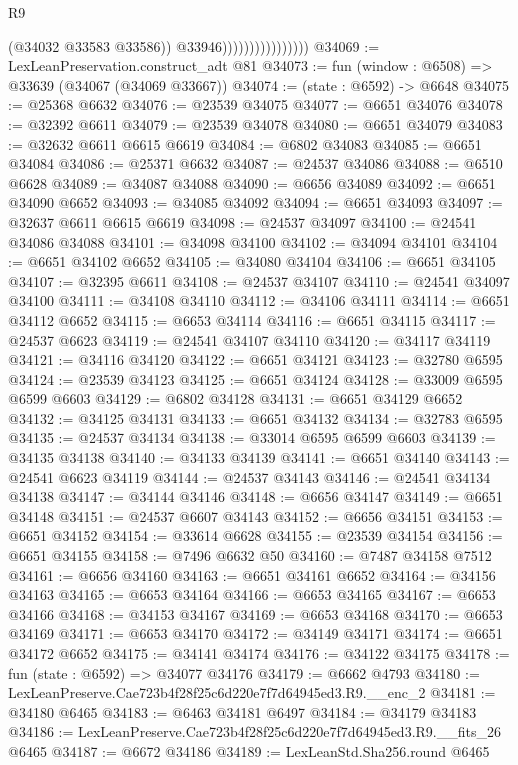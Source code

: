 \begin{lexlean}{R9}
\begin{coremodule}
                                      (@34032 @33583 @33586))
                                    @33946))))))))))))))))
@34069 := LexLeanPreservation.construct_adt @81
@34073 := fun (window : @6508) => @33639 (@34067 (@34069 @33667))
@34074 := (state : @6592) -> @6648
@34075 := @25368 @6632
@34076 := @23539 @34075
@34077 := @6651 @34076
@34078 := @32392 @6611
@34079 := @23539 @34078
@34080 := @6651 @34079
@34083 := @32632 @6611 @6615 @6619
@34084 := @6802 @34083
@34085 := @6651 @34084
@34086 := @25371 @6632
@34087 := @24537 @34086
@34088 := @6510 @6628
@34089 := @34087 @34088
@34090 := @6656 @34089
@34092 := @6651 @34090 @6652
@34093 := @34085 @34092
@34094 := @6651 @34093
@34097 := @32637 @6611 @6615 @6619
@34098 := @24537 @34097
@34100 := @24541 @34086 @34088
@34101 := @34098 @34100
@34102 := @34094 @34101
@34104 := @6651 @34102 @6652
@34105 := @34080 @34104
@34106 := @6651 @34105
@34107 := @32395 @6611
@34108 := @24537 @34107
@34110 := @24541 @34097 @34100
@34111 := @34108 @34110
@34112 := @34106 @34111
@34114 := @6651 @34112 @6652
@34115 := @6653 @34114
@34116 := @6651 @34115
@34117 := @24537 @6623
@34119 := @24541 @34107 @34110
@34120 := @34117 @34119
@34121 := @34116 @34120
@34122 := @6651 @34121
@34123 := @32780 @6595
@34124 := @23539 @34123
@34125 := @6651 @34124
@34128 := @33009 @6595 @6599 @6603
@34129 := @6802 @34128
@34131 := @6651 @34129 @6652
@34132 := @34125 @34131
@34133 := @6651 @34132
@34134 := @32783 @6595
@34135 := @24537 @34134
@34138 := @33014 @6595 @6599 @6603
@34139 := @34135 @34138
@34140 := @34133 @34139
@34141 := @6651 @34140
@34143 := @24541 @6623 @34119
@34144 := @24537 @34143
@34146 := @24541 @34134 @34138
@34147 := @34144 @34146
@34148 := @6656 @34147
@34149 := @6651 @34148
@34151 := @24537 @6607 @34143
@34152 := @6656 @34151
@34153 := @6651 @34152
@34154 := @33614 @6628
@34155 := @23539 @34154
@34156 := @6651 @34155
@34158 := @7496 @6632 @50
@34160 := @7487 @34158 @7512
@34161 := @6656 @34160
@34163 := @6651 @34161 @6652
@34164 := @34156 @34163
@34165 := @6653 @34164
@34166 := @6653 @34165
@34167 := @6653 @34166
@34168 := @34153 @34167
@34169 := @6653 @34168
@34170 := @6653 @34169
@34171 := @6653 @34170
@34172 := @34149 @34171
@34174 := @6651 @34172 @6652
@34175 := @34141 @34174
@34176 := @34122 @34175
@34178 := fun (state : @6592) => @34077 @34176
@34179 := @6662 @4793
@34180 := LexLeanPreserve.Cae723b4f28f25c6d220e7f7d64945ed3.R9.__enc_2
@34181 := @34180 @6465
@34183 := @6463 @34181 @6497
@34184 := @34179 @34183
@34186 := LexLeanPreserve.Cae723b4f28f25c6d220e7f7d64945ed3.R9.__fits_26 @6465
@34187 := @6672 @34186
@34189 := LexLeanStd.Sha256.round @6465

\end{coremodule}
\end{lexlean}
